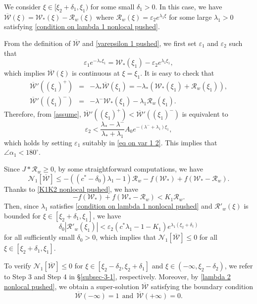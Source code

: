 \documentclass[11pt,a4paper]{article}
\numberwithin{equation}{section}
\numberwithin{figure}{section}
\newcommand\beaa{\begin{eqnarray*}}
\newcommand\eeaa{\end{eqnarray*}}
\begin{document}
 We consider $\xi\in[\xi_2+\delta_1,\xi_1)$ for some small $\delta_1>0$. In this case, we have $\overline{\mathcal{W}}(\xi)=\mathcal{W}_*(\xi)-\mathcal{R}_w(\xi)$ where $\mathcal{R}_w(\xi)=\varepsilon_2 e^{\lambda_1\xi}$
for some large $\lambda_1>0$ satisfying \eqref{condition on lambda 1 nonlocal pushed}.

From the definition of $\overline{\mathcal{W}}$ and \eqref{varepsilon 1 pushed},
we first set $\varepsilon_1$ and $\varepsilon_2$ such that
\begin{equation}\label{eq on var 1 2}
\varepsilon_1e^{-\lambda_*\xi_1}=\mathcal{W}_*(\xi_1)-\varepsilon_2e^{\lambda_1\xi_1},
\end{equation}
which implies $\overline{\mathcal{W}}(\xi)$ is continuous at $\xi=\xi_1$.
It is easy to check that 
\beaa
\overline{\mathcal{W}}'((\xi_1)^+)&=&-\lambda_*\overline{\mathcal{W}}(\xi_1)=-\lambda_*(\mathcal{W}_*(\xi_1)+\mathcal{R}_w(\xi_1)),\\
\overline{\mathcal{W}}'((\xi_1)^-)&=&-\lambda^-\mathcal{W}_*(\xi_1)-\lambda_1\mathcal{R}_w(\xi_1).
\eeaa
Therefore, from \eqref{assume}, $\overline{\mathcal{W}}'((\xi_1)^+)<\overline{\mathcal{W}}'((\xi_1)^-)$ is equivalent to 
\begin{equation*}
\varepsilon_2<\frac{\lambda_*-\lambda^-}{\lambda_*+\lambda_1}A_0e^{-(\lambda^-+\lambda_1)\xi_1},
\end{equation*}
which holds by setting $\varepsilon_1$ suitably in \eqref{eq on var 1 2}.
This implies that $\angle\alpha_1<180^{\circ}$.

Since $J\ast \mathcal{R}_w\ge 0$, by some  straightforward computations, we have
\begin{equation*}
\mathcal{N}_1[\overline{\mathcal{W}}]
\le-((c^*-\delta_0)\lambda_1-1)\mathcal{R}_w-f(\mathcal{W}_*)+f(\mathcal{W}_*-\mathcal{R}_w).
\end{equation*}
Thanks to \eqref{K1K2 nonlocal pushed}, we have
$$-f(\mathcal{W}_*)+f(\mathcal{W}_*-\mathcal{R}_w)< K_1\mathcal{R}_w.$$
Then, 
since
$\lambda_1$ satisfies \eqref{condition on lambda 1 nonlocal pushed} and $\mathcal{R}'_w(\xi)$ is bounded for $\xi\in[\xi_2+\delta_1,\xi_1]$, we have
$$\delta_0|\mathcal{R}'_w(\xi_1)|<\varepsilon_2(c^*\lambda_1-1-K_1) e^{\lambda_1(\xi_2+\delta_1)}$$
for all sufficiently small $\delta_0>0$,
which implies that $\mathcal{N}_1[\bar{\mathcal W}]\le 0$ for all $\xi\in[\xi_2+\delta_1,\xi_1]$.

\medskip

To verify $\mathcal{N}_1[\overline{\mathcal{W}}]\le 0$ for $\xi\in[\xi_2-\delta_2,\xi_2+\delta_1]$ and $\xi\in(-\infty,\xi_2-\delta_2)$, we refer to Step 3 and Step 4 in \S \ref{subsec-3-1}, respectively. Moreover, by \eqref{lambda 2 nonlocal pushed}, we obtain a super-solution  $\overline{\mathcal{W}}$ satisfying the boundary condition
$$\overline{\mathcal{W}}(-\infty)=1\ \ \text{and}\ \ \overline{\mathcal{W}}(+\infty)=0.$$
\end{document}
